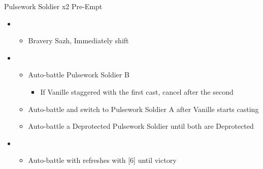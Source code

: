 \begin{battle}{Pulsework Soldier x2 Pre-Empt}
\begin{itemize}
    \item \second
    \begin{itemize}
        \item Bravery Sazh, Immediately shift
    \end{itemize}
    \item \third
    \begin{itemize}
        \item Auto-battle Pulsework Soldier B
        \begin{itemize}
            \item If Vanille staggered with the first cast, cancel after the second
        \end{itemize}
        \item Auto-battle and switch to Pulsework Soldier A after Vanille starts casting
        \item Auto-battle a Deprotected Pulsework Soldier until both are Deprotected
    \end{itemize}
    \item \first
    \begin{itemize}
        \item Auto-battle with refreshes with [6] until victory
    \end{itemize}
\end{itemize}
\end{battle}

